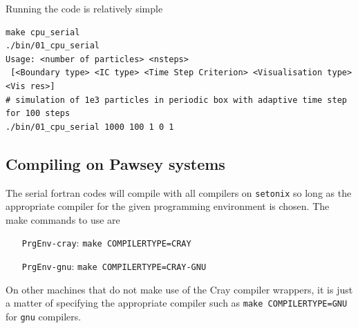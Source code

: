 \par 
Running the code is relatively simple  
\begin{center}
\begin{minipage}{0.95\textwidth}
\small
\begin{verbatim}
make cpu_serial
./bin/01_cpu_serial 
Usage: <number of particles> <nsteps>
 [<Boundary type> <IC type> <Time Step Criterion> <Visualisation type> <Vis res>]
# simulation of 1e3 particles in periodic box with adaptive time step for 100 steps  
./bin/01_cpu_serial 1000 100 1 0 1  
\end{verbatim}
\end{minipage}
\end{center}

\subsection{Compiling on Pawsey systems}
The serial fortran codes will compile with all compilers on \texttt{setonix} so long as the appropriate compiler for the given programming environment is chosen. The make commands to use are 
\begin{itemize}
    \setlength{\itemindent}{70pt}
    \item[\texttt{PrgEnv-cray}:\quad]{\texttt{make COMPILERTYPE=CRAY}}
    \item[\texttt{PrgEnv-gnu}:\quad]{\texttt{make COMPILERTYPE=CRAY-GNU}}
\end{itemize}
On other machines that do not make use of the Cray compiler wrappers, it is just a matter of specifying the appropriate compiler such as \texttt{make COMPILERTYPE=GNU} for \texttt{gnu} compilers.

